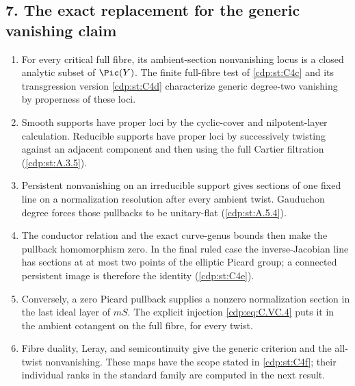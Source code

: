 \subsection*{7. The exact replacement for the generic vanishing claim}
\RungOne
\begin{enumerate}[label=\arabic*.,leftmargin=*]
\item For every critical full fibre, its ambient-section
nonvanishing locus is a closed analytic subset of $\Pic(Y)$.
The finite full-fibre test of \ref{cdp:st:C4c} and its
transgression version \ref{cdp:st:C4d} characterize generic
degree-two vanishing by properness of these loci.
\item Smooth supports have proper loci by the cyclic-cover and
nilpotent-layer calculation.  Reducible supports have proper loci
by successively twisting against an adjacent component and then
using the full Cartier filtration (\ref{cdp:st:A.3.5}).
\item Persistent nonvanishing on an irreducible support gives
sections of one fixed line on a normalization resolution after
every ambient twist.  Gauduchon degree forces those pullbacks to
be unitary-flat (\ref{cdp:st:A.5.4}).
\item The conductor relation and the exact curve-genus bounds
then make the pullback homomorphism zero.  In the final ruled
case the inverse-Jacobian line has sections at at most two points
of the elliptic Picard group; a connected persistent image is
therefore the identity (\ref{cdp:st:C4e}).
\item Conversely, a zero Picard pullback supplies a nonzero
normalization section in the last ideal layer of $mS$.
The explicit injection \eqref{cdp:eq:C.VC.4} puts it in the
ambient cotangent on the full fibre, for every twist.
\item Fibre duality, Leray, and semicontinuity give the generic
criterion and the all-twist nonvanishing.  These maps have the
scope stated in \ref{cdp:st:C4f}; their individual ranks in the
standard family are computed in the next result.
\end{enumerate}

